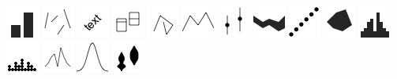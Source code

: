 \documentclass[
  letterpaper,
  DIV=11,
  numbers=noendperiod]{scrreprt}
\begin{document}
\includegraphics{src/../images/geom_rect.png}
\includegraphics{src/../images/geom_segment.png}
\includegraphics{src/../images/geom_text.png}
\includegraphics{src/../images/geom_crossbar.png}
\includegraphics{src/../images/geom_path.png}
\includegraphics{src/../images/geom_line.png}
\includegraphics{src/../images/geom_pointrange.png}
\includegraphics{src/../images/geom_ribbon.png}
\includegraphics{src/../images/geom_point.png}
\includegraphics{src/../images/geom_polygon.png}
\includegraphics{src/../images/geom_histogram.png}
\includegraphics{src/../images/geom_dotplot.png}
\includegraphics{src/../images/geom_freqpoly.png}
\includegraphics{src/../images/geom_density.png}
\includegraphics{src/../images/geom_violin.png}
\end{document}
